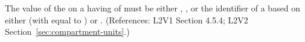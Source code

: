 The value of the   on a \Compartment having
 of  must be either ,
, or the identifier of a \UnitDefinition based on
either  (with  equal to ) or
.  (References: L2V1 Section 4.5.4; L2V2
Section~\ref{sec:compartment-units}.)
